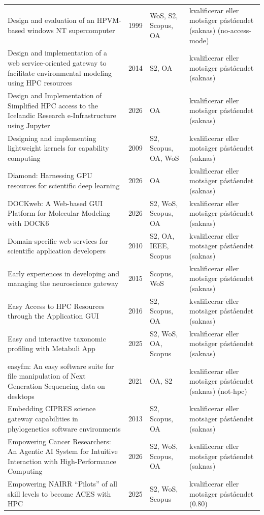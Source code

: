 \begin{longtable}{@{}%
  >{\raggedright\arraybackslash}p{}c%
  >{\raggedright\arraybackslash}p{}%
  >{\raggedright\arraybackslash}p{}@{}}
Design and evaluation of an HPVM-based windows NT supercomputer & 1999 & WoS, S2, Scopus, OA & kvalificerar eller motsäger påståendet (saknas) (no-access-mode) \\
Design and implementation of a web service-oriented gateway to facilitate environmental modeling using HPC resources & 2014 & S2, OA & kvalificerar eller motsäger påståendet (saknas) \\
Design and Implementation of Simplified HPC access to the Icelandic Research e-Infrastructure using Jupyter & 2026 & OA & kvalificerar eller motsäger påståendet (saknas) \\
Designing and implementing lightweight kernels for capability computing & 2009 & S2, Scopus, OA, WoS & kvalificerar eller motsäger påståendet (saknas) \\
Diamond: Harnessing GPU resources for scientific deep learning & 2026 & OA & kvalificerar eller motsäger påståendet (saknas) \\
DOCKweb: A Web-based GUI Platform for Molecular Modeling with DOCK6 & 2026 & S2, WoS, Scopus, OA & kvalificerar eller motsäger påståendet (saknas) \\
Domain-specific web services for scientific application developers & 2010 & S2, OA, IEEE, Scopus & kvalificerar eller motsäger påståendet (saknas) \\
Early experiences in developing and managing the neuroscience gateway & 2015 & Scopus, WoS & kvalificerar eller motsäger påståendet (saknas) \\
Easy Access to HPC Resources through the Application GUI & 2016 & S2, Scopus, OA & kvalificerar eller motsäger påståendet (saknas) \\
Easy and interactive taxonomic profiling with Metabuli App & 2025 & S2, WoS, OA, Scopus & kvalificerar eller motsäger påståendet (saknas) \\
easyfm: An easy software suite for file manipulation of Next Generation Sequencing data on desktops & 2021 & OA, S2 & kvalificerar eller motsäger påståendet (saknas) (not-hpc) \\
Embedding CIPRES science gateway capabilities in phylogenetics software environments & 2013 & S2, Scopus, OA & kvalificerar eller motsäger påståendet (saknas) \\
Empowering Cancer Researchers: An Agentic AI System for Intuitive Interaction with High-Performance Computing & 2026 & S2, WoS, Scopus, OA & kvalificerar eller motsäger påståendet (saknas) \\
Empowering NAIRR ``Pilots'' of all skill levels to become \textquotedbl{}ACES\textquotedbl{} with HPC & 2025 & S2, WoS, Scopus & kvalificerar eller motsäger påståendet (0.80) \\

\end{longtable}
